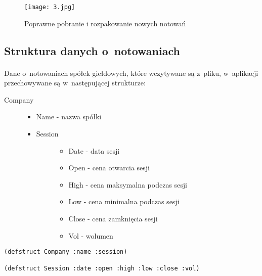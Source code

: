 \begin{figure}[H]
	\centering
	\texttt{[image: 3.jpg]}
	\caption{Poprawne pobranie i rozpakowanie nowych notowań}
	\label{fig:3}
\end{figure}

\subsection{Struktura danych o~notowaniach}

\paragraph{}
Dane o~notowaniach spółek giełdowych, które wczytywane są z~pliku, w~aplikacji przechowywane są w~następującej strukturze:
\begin{description} 
	\item[Company] \hfill
		\begin{itemize}
			\item Name - nazwa spółki
			\item \begin{description}
					\item[Session] \hfill
						\begin{itemize}
							\item Date - data sesji
							\item Open - cena otwarcia sesji
							\item High - cena maksymalna podczas sesji
							\item Low - cena minimalna podczas sesji
							\item Close - cena zamknięcia sesji
							\item Vol - wolumen
						\end{itemize}
				\end{description}
		\end{itemize}
\end{description}

\begin{lstlisting}
(defstruct Company :name :session)

(defstruct Session :date :open :high :low :close :vol)
\end{lstlisting}

